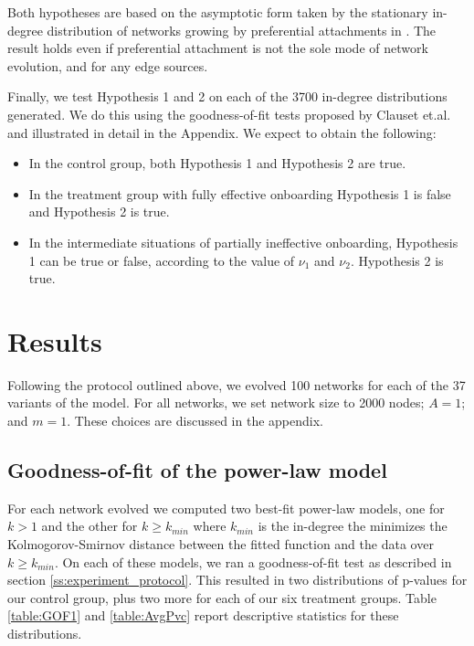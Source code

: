 \documentclass{article}
\begin{document}
Both hypotheses are based on the asymptotic form taken by the stationary in-degree distribution of networks growing by preferential attachments in \cite{dorogovtsev2002evolution}. The result holds even if preferential attachment is not the sole mode of network evolution, and for any edge sources.

Finally, we test Hypothesis 1 and 2 on each of the 3700 in-degree distributions generated. We do this using the goodness-of-fit tests proposed by Clauset et.al. \cite{clauset2009power} and illustrated in detail in the Appendix. We expect to obtain the following:

\begin{itemize}
\item In the control group, both Hypothesis 1 and Hypothesis 2 are true. 
\item In the treatment group with fully effective onboarding Hypothesis 1 is false and Hypothesis 2 is true. 
\item In the intermediate situations of partially ineffective onboarding, Hypothesis 1 can be true or false, according to the value of $\nu_1$ and $\nu_2$. Hypothesis 2 is true.
\end{itemize}



\section{Results}\label{sec:results}
Following the protocol outlined above, we evolved 100 networks for each of the 37 variants of the model. For all networks, we set network size to 2000 nodes; $A = 1$; and $m = 1$. These choices are discussed in the appendix.

\subsection{Goodness-of-fit of the power-law model} \label{ssec:GOF of power law}

For each network evolved we computed two best-fit power-law models, one for $k > 1$ and the other for $k\geq k_{min}$ where $k_{min}$ is the in-degree the minimizes the Kolmogorov-Smirnov distance between the fitted function and the data over $k \geq k_{min}$. On each of these models, we ran a goodness-of-fit test as described in section \ref{ss:experiment_protocol}. This resulted in two distributions of p-values for our control group, plus two more for each of our six treatment groups. Table \ref{table:GOF1}
 and \ref{table:AvgPvc} report descriptive statistics for these distributions.
\end{document}
